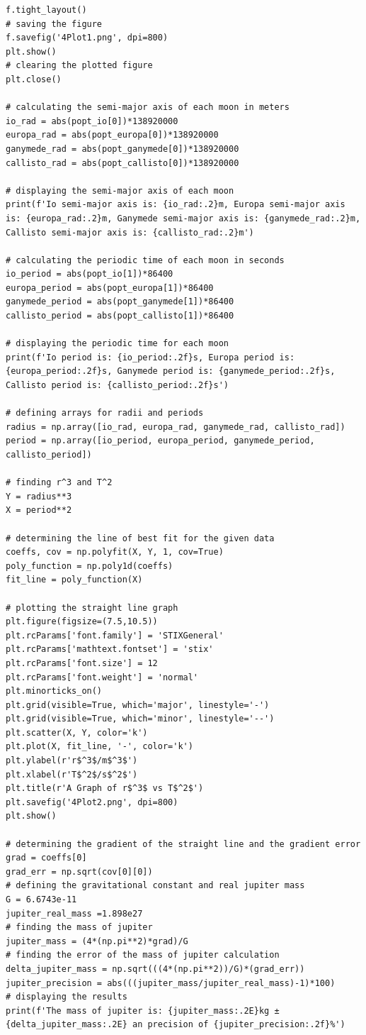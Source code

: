 \documentclass[12pt, a4paper]{article}
\begin{document}
\begin{verbatim}
f.tight_layout()
# saving the figure
f.savefig('4Plot1.png', dpi=800)
plt.show()
# clearing the plotted figure
plt.close()

# calculating the semi-major axis of each moon in meters
io_rad = abs(popt_io[0])*138920000
europa_rad = abs(popt_europa[0])*138920000
ganymede_rad = abs(popt_ganymede[0])*138920000
callisto_rad = abs(popt_callisto[0])*138920000

# displaying the semi-major axis of each moon
print(f'Io semi-major axis is: {io_rad:.2}m, Europa semi-major axis is: {europa_rad:.2}m, Ganymede semi-major axis is: {ganymede_rad:.2}m, Callisto semi-major axis is: {callisto_rad:.2}m')

# calculating the periodic time of each moon in seconds
io_period = abs(popt_io[1])*86400
europa_period = abs(popt_europa[1])*86400
ganymede_period = abs(popt_ganymede[1])*86400
callisto_period = abs(popt_callisto[1])*86400

# displaying the periodic time for each moon
print(f'Io period is: {io_period:.2f}s, Europa period is: {europa_period:.2f}s, Ganymede period is: {ganymede_period:.2f}s, Callisto period is: {callisto_period:.2f}s')

# defining arrays for radii and periods
radius = np.array([io_rad, europa_rad, ganymede_rad, callisto_rad])
period = np.array([io_period, europa_period, ganymede_period, callisto_period])

# finding r^3 and T^2
Y = radius**3
X = period**2

# determining the line of best fit for the given data
coeffs, cov = np.polyfit(X, Y, 1, cov=True)
poly_function = np.poly1d(coeffs)
fit_line = poly_function(X)

# plotting the straight line graph
plt.figure(figsize=(7.5,10.5))
plt.rcParams['font.family'] = 'STIXGeneral'
plt.rcParams['mathtext.fontset'] = 'stix'
plt.rcParams['font.size'] = 12
plt.rcParams['font.weight'] = 'normal'
plt.minorticks_on()
plt.grid(visible=True, which='major', linestyle='-')
plt.grid(visible=True, which='minor', linestyle='--')
plt.scatter(X, Y, color='k')
plt.plot(X, fit_line, '-', color='k')
plt.ylabel(r'r$^3$/m$^3$')
plt.xlabel(r'T$^2$/s$^2$')
plt.title(r'A Graph of r$^3$ vs T$^2$')
plt.savefig('4Plot2.png', dpi=800)
plt.show()

# determining the gradient of the straight line and the gradient error
grad = coeffs[0]
grad_err = np.sqrt(cov[0][0])
# defining the gravitational constant and real jupiter mass
G = 6.6743e-11
jupiter_real_mass =1.898e27
# finding the mass of jupiter
jupiter_mass = (4*(np.pi**2)*grad)/G
# finding the error of the mass of jupiter calculation
delta_jupiter_mass = np.sqrt(((4*(np.pi**2))/G)*(grad_err))
jupiter_precision = abs(((jupiter_mass/jupiter_real_mass)-1)*100)
# displaying the results
print(f'The mass of jupiter is: {jupiter_mass:.2E}kg ± {delta_jupiter_mass:.2E} an precision of {jupiter_precision:.2f}%')


\end{verbatim}
\end{document}
